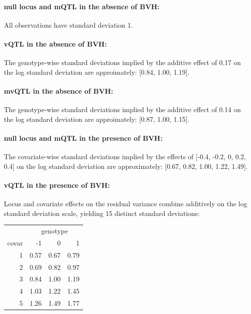     \paragraph{null locus and mQTL in the absence of BVH:}
    All observations have standard deviation 1.

    \paragraph{vQTL in the absence of BVH:}
    The genotype-wise standard deviations implied by the additive effect of 0.17 on the log standard deviation are approimately: [0.84, 1.00, 1.19].

    \paragraph{mvQTL in the absence of BVH:}
    The genotype-wise standard deviations implied by the additive effect of 0.14 on the log standard deviation are approimately: [0.87, 1.00, 1.15].

    \paragraph{null locus and mQTL in the presence of BVH:}
    The covariate-wise standard deviations implied by the effects of [-0.4, -0.2, 0, 0.2, 0.4] on the log standard deviation are approximately:  [0.67, 0.82, 1.00, 1.22, 1.49].

    \paragraph{vQTL in the presence of BVH:}
      Locus and covariate effects on the residual variance combine additively on the log standard deviation scale, yielding 15 distinct standard deviations:
        \begin{table}[ht]
        \centering
        \begin{tabular}{rrrr}
            \hline
            & \multicolumn{3}{c}{genotype}\\
            \cmidrule{2-4}
            covar & -1 & 0 & 1 \\
            \hline
            1 & 0.57 & 0.67 & 0.79 \\
            2 & 0.69 & 0.82 & 0.97 \\
            3 & 0.84 & 1.00 & 1.19 \\
            4 & 1.03 & 1.22 & 1.45 \\
            5 & 1.26 & 1.49 & 1.77 \\
           \hline
        \end{tabular}
        \end{table}


